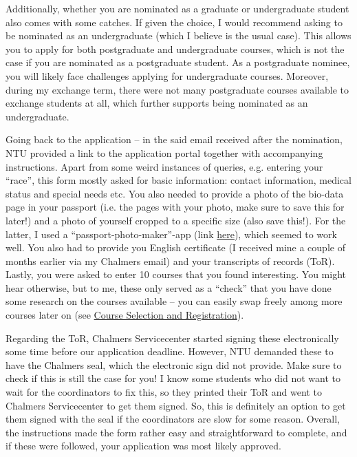 Additionally, whether you are nominated as a graduate or undergraduate student also comes with some catches. If given the choice, I would recommend asking to be nominated as an undergraduate (which I believe is the usual case). This allows you to apply for both postgraduate and undergraduate courses, which is not the case if you are nominated as a postgraduate student. As a postgraduate nominee, you will likely face challenges applying for undergraduate courses. Moreover, during my exchange term, there were not many postgraduate courses available to exchange students at all, which further supports being nominated as an undergraduate.

Going back to the application -- in the said email received after the nomination, NTU provided a link to the application portal together with accompanying instructions. Apart from some weird instances of queries, e.g. entering your ``race'', this form mostly asked for basic information: contact information, medical status and special needs etc. You also needed to provide a photo of the bio-data page in your passport (i.e. the pages with your photo, make sure to save this for later!) and a photo of yourself cropped to a specific size (also save this!). For the latter, I used a ``passport-photo-maker''-app (link \href{https://www.google.com/url?sa=t&source=web&rct=j&opi=89978449&url=https://apps.apple.com/se/app/passport-size-photo-maker-app/id1615533705&ved=2ahUKEwjq7fmg14eKAxXlIRAIHYyYDKcQFnoECEIQAQ&usg=AOvVaw2MFZUfJ5qukJls3hL6DmwZ}{here}), which seemed to work well. You also had to provide you English certificate (I received mine a couple of months earlier via my Chalmers email) and your transcripts of records (ToR). Lastly, you were asked to enter 10 courses that you found interesting. You might hear otherwise, but to me, these only served as a ``check'' that you have done some research on the courses available -- you can easily swap freely among more courses later on (see \hyperref[courses]{Course Selection and Registration}).

Regarding the ToR, Chalmers Servicecenter started signing these electronically some time before our application deadline. However, NTU demanded these to have the Chalmers seal, which the electronic sign did not provide. Make sure to check if this is still the case for you! I know some students who did not want to wait for the coordinators to fix this, so they printed their ToR and went to Chalmers Servicecenter to get them signed. So, this is definitely an option to get them signed with the seal if the coordinators are slow for some reason. Overall, the instructions made the form rather easy and straightforward to complete, and if these were followed, your application was most likely approved.
